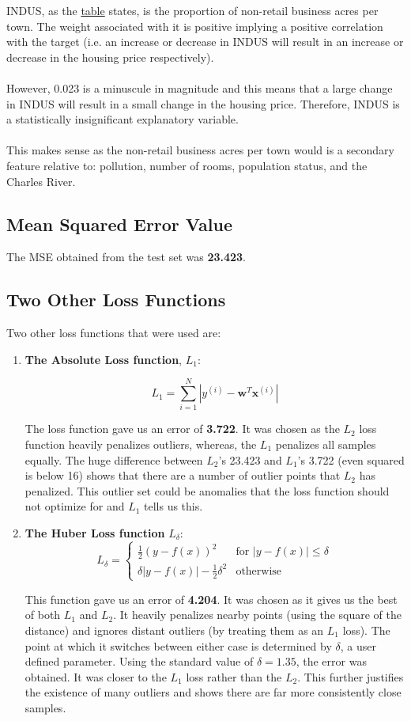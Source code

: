 \documentclass[10pt]{article}
\begin{document}
INDUS, as the \hyperref[sec:hfs]{table} states, is the proportion of non-retail business acres per town. The weight associated with it is positive implying a positive correlation with the target (i.e. an increase or decrease in INDUS will result in an increase or decrease in the housing price respectively). 
\\ \\
However, 0.023 is a minuscule in magnitude and this means that a large change in INDUS will result in a small change in the housing price. Therefore, INDUS is a statistically insignificant explanatory variable. 
\\ \\
This makes sense as the non-retail business acres per town would is a secondary feature relative to: pollution, number of rooms, population status, and the Charles River. 

\subsection{Mean Squared Error Value}
The MSE obtained from the test set was \textbf{23.423}.

\subsection{Two Other Loss Functions}
Two other loss functions that were used are: 
\begin{enumerate}
\item \textbf{The Absolute Loss function}, $L_1$:

\[L_{1} = 
\sum_{i=1}^{N}
|y^{(i)} - \textbf{w}^T\textbf{x}^{(i)}|
\]

The loss function gave us an error of \textbf{3.722}. It was chosen as the $L_2$ loss function heavily penalizes outliers, whereas, the $L_1$ penalizes all samples equally. The huge difference between $L_2$'s 23.423 and $L_1$'s 3.722 (even squared is below 16) shows that there are a number of outlier points that $L_2$ has penalized. This outlier set could be anomalies that the loss function should not optimize for and $L_1$ tells us this.

\item \textbf{The Huber Loss function} $L_{\delta}$: 
\[
L_{\delta} = 
\begin{cases}
{\frac{1}{2}(y-f(x))^2} & {} \text{for }|y-f(x)|
\leq \delta
\\{\delta|y-f(x)| - \frac{1}{2}\delta^2} & \text{otherwise}\end{cases}
\]

This function gave us an error of \textbf{4.204}. It was chosen as it gives us the best of both $L_1$ and $L_2$. It heavily penalizes nearby points (using the square of the distance) and ignores distant outliers (by treating them as an $L_1$ loss). The point at which it switches between either case is determined by $\delta$, a user defined parameter. Using the standard value of $\delta = 1.35$, the error was obtained. It was closer to the $L_1$ loss rather than the $L_2$. This further justifies the existence of many outliers and shows there are far more consistently close samples. 


\end{enumerate}
\end{document}
